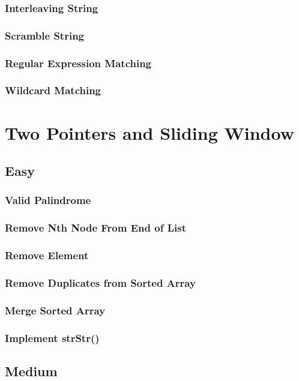 \documentclass[11pt]{book}
\begin{document}
\subsection{Interleaving String}
\label{sec-14-3-9}
\subsection{Scramble String}
\label{sec-14-3-10}
\subsection{Regular Expression Matching}
\label{sec-14-3-11}
\subsection{Wildcard Matching}
\label{sec-14-3-12}
\chapter{Two Pointers and Sliding Window}
\label{sec-15}
\section{Easy}
\label{sec-15-1}
\subsection{Valid Palindrome}
\label{sec-15-1-1}
\subsection{Remove Nth Node From End of List}
\label{sec-15-1-2}
\subsection{Remove Element}
\label{sec-15-1-3}
\subsection{Remove Duplicates from Sorted Array}
\label{sec-15-1-4}
\subsection{Merge Sorted Array}
\label{sec-15-1-5}
\subsection{Implement strStr()}
\label{sec-15-1-6}
\section{Medium}
\label{sec-15-2}
\end{document}
